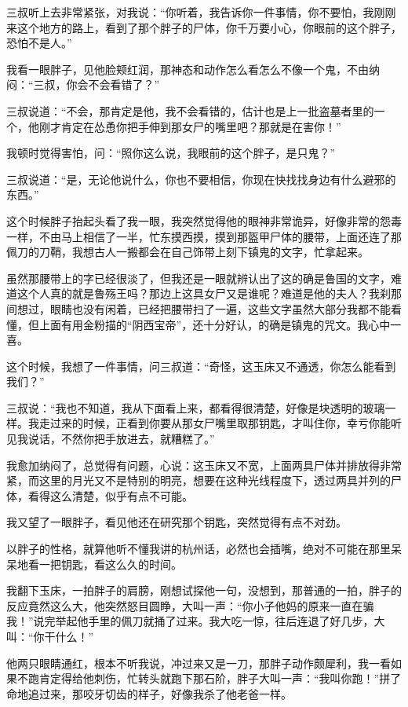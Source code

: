 三叔听上去非常紧张，对我说：“你听着，我告诉你一件事情，你不要怕，我刚刚来这个地方的路上，看到了那个胖子的尸体，你千万要小心，你眼前的这个胖子，恐怕不是人。”

我看一眼胖子，见他脸颊红润，那神态和动作怎么看怎么不像一个鬼，不由纳闷：“三叔，你会不会看错了？”

三叔说道：“不会，那肯定是他，我不会看错的，估计也是上一批盗墓者里的一个，他刚才肯定在怂恿你把手伸到那女尸的嘴里吧？那就是在害你！”

我顿时觉得害怕，问：“照你这么说，我眼前的这个胖子，是只鬼？”

三叔说道：“是，无论他说什么，你也不要相信，你现在快找找身边有什么避邪的东西。”

这个时候胖子抬起头看了我一眼，我突然觉得他的眼神非常诡异，好像非常的怨毒一样，不由马上相信了一半，忙东摸西摸，摸到那盔甲尸体的腰带，上面还连了那佩刀的刀鞘，我想古人一搬都会在自己饰带上刻下镇鬼的文字，忙拿起来。

虽然那腰带上的字已经很淡了，但我还是一眼就辨认出了这的确是鲁国的文字，难道这个人真的就是鲁殇王吗？那边上这具女尸又是谁呢？难道是他的夫人？我刹那间想过，眼睛也没有闲着，已经把腰带扫了一遍，这些文字虽然大部分我都不能看懂，但上面有用金粉描的“阴西宝帝”，还十分好认，的确是镇鬼的咒文。我心中一喜。

这个时候，我想了一件事情，问三叔道：“奇怪，这玉床又不通透，你怎么能看到我们？”

三叔说：“我也不知道，我从下面看上来，都看得很清楚，好像是块透明的玻璃一样。我走过来的时候，正看到你要从那女尸嘴里取那钥匙，才叫住你，幸亏你能听见我说话，不然你把手放进去，就糟糕了。”

我愈加纳闷了，总觉得有问题，心说：这玉床又不宽，上面两具尸体并排放得非常紧，而这里的月光又不是特别的明亮，想要在这种光线程度下，透过两具并列的尸体，看得这么清楚，似乎有点不可能。

我又望了一眼胖子，看见他还在研究那个钥匙，突然觉得有点不对劲。

以胖子的性格，就算他听不懂我讲的杭州话，必然也会插嘴，绝对不可能在那里呆呆地看一把钥匙，看这么久的时间。

我翻下玉床，一拍胖子的肩膀，刚想试探他一句，没想到，那普通的一拍，胖子的反应竟然这么大，他突然怒目圆睁，大叫一声：“你小子他妈的原来一直在骗我！”说完举起他手里的佩刀就捅了过来。我大吃一惊，往后连退了好几步，大叫：“你干什么！”

他两只眼睛通红，根本不听我说，冲过来又是一刀，那胖子动作颇犀利，我一看如果不跑肯定得给他刺伤，忙转头就跑下那石阶，胖子大叫一声：“我叫你跑！”拼了命地追过来，那咬牙切齿的样子，好像我杀了他老爸一样。

